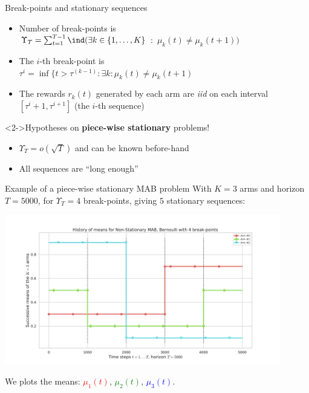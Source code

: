 \documentclass[11pt,english,ignorenonframetext,]{beamer}
\providecommand{\tightlist}{%
  \setlength{\itemsep}{0pt}\setlength{\parskip}{0pt}}
\begin{document}
\begin{frame}{Break-points and stationary sequences}

  \begin{itemize}
    \item
    Number of break-points is\\
    $\Upsilon_T = \sum_{t=1}^{T-1} \ind(\exists k\in \{1,\dots,K\}$ $:$ $\mu_k(t) \neq \mu_k(t+1) )$

    \item
    The $i$-th break-point is\\
    $\tau^{i} = \inf\{t > \tau^{(k-1)} : \exists k : \mu_k(t) \neq \mu_k(t+1)$

    \item
    The rewards $r_k(t)$ generated by each arm are \emph{iid} on each interval $[\tau^{i} + 1, \tau^{i+1}]$ (the $i$-th sequence)
  \end{itemize}

  \begin{block}<2->{Hypotheses on \textbf{piece-wise stationary} problems!}
    \begin{itemize}\tightlist
      \item $\Upsilon_T = o(\sqrt{T})$ and \alert{can be known before-hand}
      \item All sequences are ``long enough''
  \end{itemize}
\end{block}
\end{frame}


\begin{frame}[plain]{Example of a piece-wise stationary MAB problem}
  With $K=3$ arms and horizon $T=5000$,
  for $\Upsilon_T=4$ break-points, giving $5$ stationary sequences:
  \begin{center}
    \includegraphics[width=0.90\textwidth]{figures/Problem_1.pdf}
  \end{center}
  We plots the means:
  \textcolor{red}{$\mu_1(t)$},
  \textcolor{green}{$\mu_2(t)$},
  \textcolor{blue}{$\mu_3(t)$}.
\end{frame}
\end{document}
